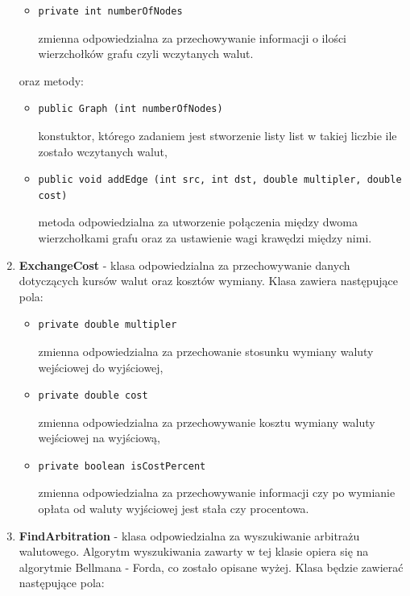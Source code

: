 ﻿\documentclass[12pt]{article}
\begin{document}
\begin{enumerate}
\begin{itemize}
    \item \begin{verbatim}private int numberOfNodes\end{verbatim}
        zmienna odpowiedzialna za przechowywanie informacji o ilości wierzchołków grafu czyli wczytanych walut.
    \end{itemize}
    oraz metody:
    \begin{itemize}
        \item \begin{verbatim}public Graph (int numberOfNodes)\end{verbatim}
        konstuktor, którego zadaniem jest stworzenie listy list w takiej liczbie ile zostało wczytanych walut,
        \item \begin{verbatim}public void addEdge (int src, int dst, double multipler, double cost)\end{verbatim}
        metoda odpowiedzialna za utworzenie połączenia między dwoma wierzchołkami grafu oraz za ustawienie wagi krawędzi między nimi.
    \end{itemize}
\item \textbf{ExchangeCost} - klasa odpowiedzialna za przechowywanie danych dotyczących kursów walut oraz kosztów wymiany. Klasa zawiera następujące pola:
    \begin{itemize}
        \item \begin{verbatim}private double multipler\end{verbatim}
        zmienna odpowiedzialna za przechowanie stosunku wymiany waluty wejściowej do wyjściowej,
    \item \begin{verbatim}private double cost\end{verbatim}
        zmienna odpowiedzialna za przechowywanie kosztu wymiany waluty wejściowej na wyjściową,
    \item \begin{verbatim}private boolean isCostPercent\end{verbatim}
        zmienna odpowiedzialna za przechowywanie informacji czy po wymianie opłata od waluty wyjściowej jest stała czy procentowa.
    \end{itemize}
\item \textbf{FindArbitration} - klasa odpowiedzialna za wyszukiwanie arbitrażu walutowego. Algorytm wyszukiwania zawarty w tej klasie opiera się na algorytmie Bellmana - Forda, co zostało opisane wyżej. Klasa będzie zawierać następujące pola:

\end{enumerate}
\end{document}
